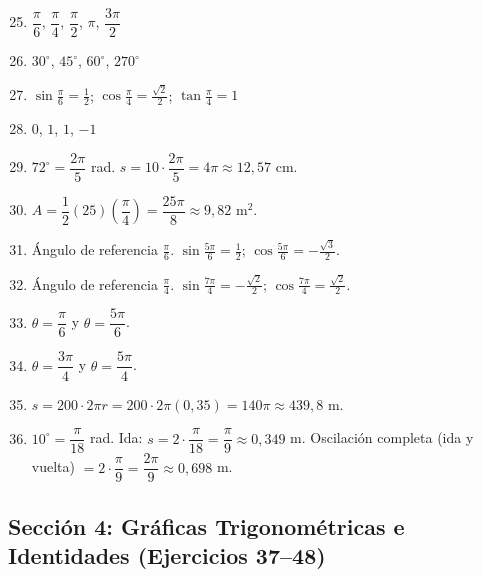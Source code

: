\documentclass[12pt, a4paper]{article}
\begin{document}
\begin{enumerate}[leftmargin=*, label=\textbf{\arabic*.}]
  \setcounter{enumi}{24}
  \item $\dfrac{\pi}{6}$, $\dfrac{\pi}{4}$, $\dfrac{\pi}{2}$, $\pi$, $\dfrac{3\pi}{2}$
  \item $30^\circ$, $45^\circ$, $60^\circ$, $270^\circ$
  \item $\sin\frac{\pi}{6} = \frac{1}{2}$; $\cos\frac{\pi}{4} = \frac{\sqrt{2}}{2}$; $\tan\frac{\pi}{4} = 1$
  \item $0$, $1$, $1$, $-1$
  \item $72^\circ = \dfrac{2\pi}{5}$ rad. $s = 10 \cdot \dfrac{2\pi}{5} = 4\pi \approx 12{,}57$ cm.
  \item $A = \dfrac{1}{2}(25)\left(\dfrac{\pi}{4}\right) = \dfrac{25\pi}{8} \approx 9{,}82$ m$^2$.
  \item Ángulo de referencia $\frac{\pi}{6}$. $\sin\frac{5\pi}{6} = \frac{1}{2}$; $\cos\frac{5\pi}{6} = -\frac{\sqrt{3}}{2}$.
  \item Ángulo de referencia $\frac{\pi}{4}$. $\sin\frac{7\pi}{4} = -\frac{\sqrt{2}}{2}$; $\cos\frac{7\pi}{4} = \frac{\sqrt{2}}{2}$.
  \item $\theta = \dfrac{\pi}{6}$ y $\theta = \dfrac{5\pi}{6}$.
  \item $\theta = \dfrac{3\pi}{4}$ y $\theta = \dfrac{5\pi}{4}$.
  \item $s = 200 \cdot 2\pi r = 200 \cdot 2\pi (0{,}35) = 140\pi \approx 439{,}8$ m.
  \item $10^\circ = \dfrac{\pi}{18}$ rad. Ida: $s = 2 \cdot \dfrac{\pi}{18} = \dfrac{\pi}{9} \approx 0{,}349$ m. Oscilación completa (ida y vuelta) $= 2 \cdot \dfrac{\pi}{9} = \dfrac{2\pi}{9} \approx 0{,}698$ m.
\end{enumerate}

\subsection*{Sección 4: Gráficas Trigonométricas e Identidades (Ejercicios 37--48)}
\end{document}
